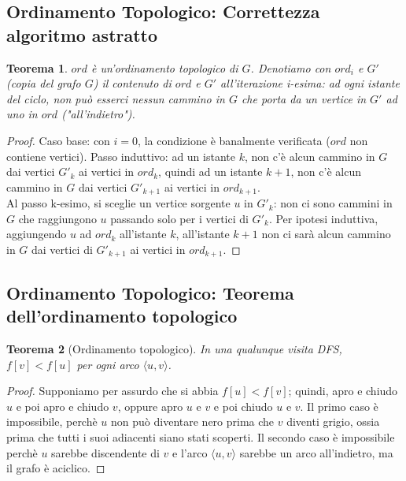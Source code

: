 \documentclass[11pt]{article}
\newtheorem*{theorem}{Teorema}
\begin{document}
\subsection*{Ordinamento Topologico: Correttezza algoritmo astratto}
\begin{theorem}
    $ord$ è un'ordinamento topologico di $G$. Denotiamo con $ord_i$ e $G'$ (copia del grafo $G$) il contenuto di $ord$ e
    $G'$ all'iterazione i-esima: ad ogni istante del ciclo, non può esserci nessun cammino in $G$ che porta da un vertice 
    in $G'$ ad uno in $ord$ ("all'indietro").
\end{theorem}
\begin{proof}
    Caso base: con $i=0$, la condizione è banalmente verificata ($ord$ non contiene vertici).
    Passo induttivo: ad un istante $k$, non c'è alcun cammino in $G$ dai vertici $G'_k$ ai vertici in $ord_k$, quindi 
    ad un istante $k+1$, non c'è alcun cammino in $G$ dai vertici $G'_{k+1}$ ai vertici in $ord_{k+1}$.\\
    Al passo k-esimo, si sceglie un vertice sorgente $u$ in $G'_k$: non ci sono cammini in $G$ che raggiungono $u$ passando solo 
    per i vertici di $G'_k$. Per ipotesi induttiva, aggiungendo $u$ ad $ord_k$ all'istante $k$, all'istante $k+1$ non ci 
    sarà alcun cammino in $G$ dai vertici di $G'_{k+1}$ ai vertici in $ord_{k+1}$.
\end{proof}
\subsection*{Ordinamento Topologico: Teorema dell'ordinamento topologico}
\begin{theorem}[Ordinamento topologico]
    In una qualunque visita DFS, $f[v]<f[u]$ per ogni arco $\langle u,v \rangle$.
\end{theorem}
\begin{proof}
    Supponiamo per assurdo che si abbia $f[u]<f[v]$; quindi, apro e chiudo $u$ e poi apro e chiudo $v$, oppure apro $u$ 
    e $v$ e poi chiudo $u$ e $v$. Il primo caso è impossibile, perchè $u$ non può diventare nero prima che $v$ diventi 
    grigio, ossia prima che tutti i suoi adiacenti siano stati scoperti. Il secondo caso è impossibile perchè $u$ sarebbe 
    discendente di $v$ e l'arco $\langle u,v \rangle$ sarebbe un arco all'indietro, ma il grafo è aciclico.
\end{proof}
\end{document}
